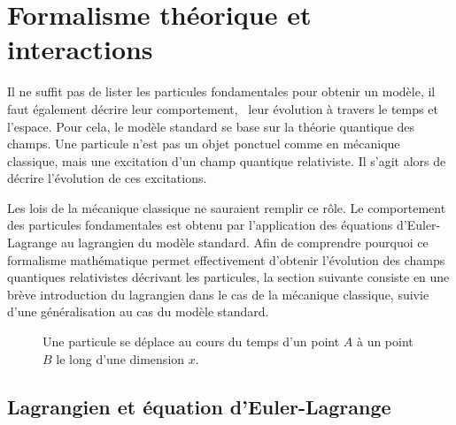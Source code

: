 \section{Formalisme théorique et interactions}\label{chapter-MS-MSSM-section-formalisme}
Il ne suffit pas de lister les particules fondamentales pour obtenir un modèle, il faut également décrire leur comportement, \ie\ leur évolution à travers le temps et l'espace.
Pour cela, le modèle standard se base sur la théorie quantique des champs. Une particule n'est pas un \og objet ponctuel \fg{} comme en mécanique classique, mais une excitation d'un champ quantique relativiste. Il s'agit alors de décrire l'évolution de ces excitations.
\par Les lois de la mécanique classique ne sauraient remplir ce rôle.
Le comportement des particules fondamentales est obtenu par l'application des équations d'Euler-Lagrange au lagrangien du modèle standard.
Afin de comprendre pourquoi ce formalisme mathématique permet effectivement d'obtenir l'évolution des champs quantiques relativistes décrivant les particules, la section suivante consiste en une brève introduction du lagrangien dans le cas de la mécanique classique, suivie d'une généralisation au cas du modèle standard.
\begin{wrapfigure}{R}{7cm}
\centering
{}
\caption[Une particule se déplace au cours du temps.]{Une particule se déplace au cours du temps d'un point $A$ à un point $B$ le long d'une dimension $x$.}
\label{fig-ptc_classique_ptA_to_pt_B}
\end{wrapfigure}
\subsection{Lagrangien et équation d'Euler-Lagrange}\label{chapter-MS-MSSM-section-formalisme-subsec-into_lagrangien}
